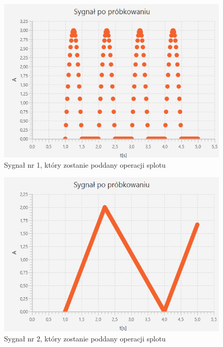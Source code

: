 \documentclass[12pt]{article}
\begin{document}
\begin{figure}[H]
    \centering
	\includegraphics[width=\linewidth]{sygnal_po_probkowaniu_2.1.png}
    \caption{Sygnał nr 1, który zostanie poddany operacji splotu}
    \label{Sygnał_2.1}
\end{figure}

\begin{figure}[H]
    \centering
	\includegraphics[width=\linewidth]{sygnal_po_probkowaniu_2.2.png}
    \caption{Sygnał nr 2, który zostanie poddany operacji splotu}
    \label{Sygnał_2.2}
\end{figure}
\end{document}
